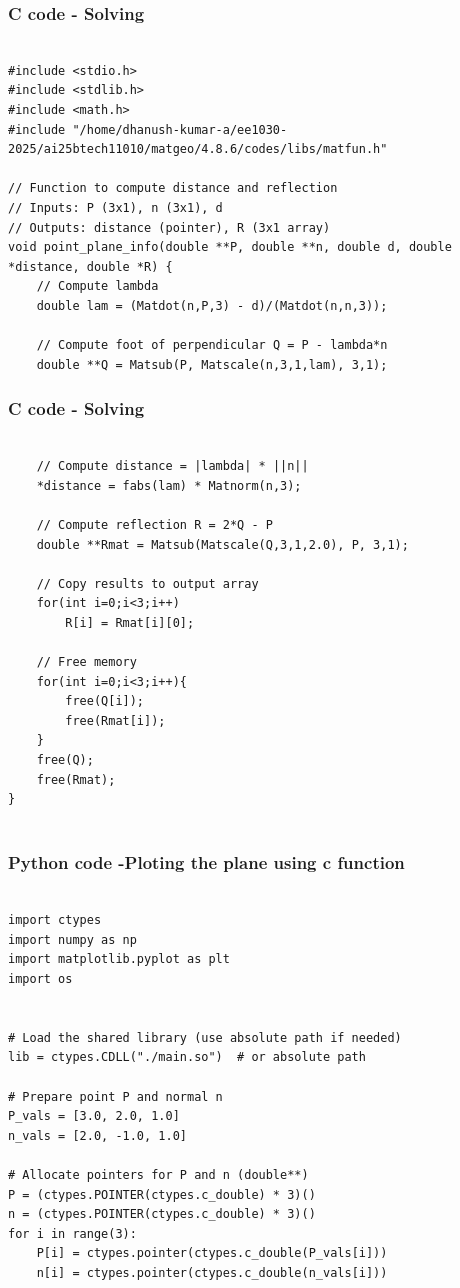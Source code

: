\documentclass{beamer}
\begin{document}
\begin{frame}[fragile]                            
\frametitle{C code - Solving}                
\begin{lstlisting}

#include <stdio.h>
#include <stdlib.h>
#include <math.h>
#include "/home/dhanush-kumar-a/ee1030-2025/ai25btech11010/matgeo/4.8.6/codes/libs/matfun.h"

// Function to compute distance and reflection
// Inputs: P (3x1), n (3x1), d
// Outputs: distance (pointer), R (3x1 array)
void point_plane_info(double **P, double **n, double d, double *distance, double *R) {
    // Compute lambda
    double lam = (Matdot(n,P,3) - d)/(Matdot(n,n,3));

    // Compute foot of perpendicular Q = P - lambda*n
    double **Q = Matsub(P, Matscale(n,3,1,lam), 3,1);
\end{lstlisting}
\end{frame}

\begin{frame}[fragile]                            
\frametitle{C code - Solving}                
\begin{lstlisting}

    // Compute distance = |lambda| * ||n||
    *distance = fabs(lam) * Matnorm(n,3);

    // Compute reflection R = 2*Q - P
    double **Rmat = Matsub(Matscale(Q,3,1,2.0), P, 3,1);

    // Copy results to output array
    for(int i=0;i<3;i++)
        R[i] = Rmat[i][0];

    // Free memory
    for(int i=0;i<3;i++){
        free(Q[i]);
        free(Rmat[i]);
    }
    free(Q);
    free(Rmat);
}


\end{lstlisting}
\end{frame}

	
\begin{frame}[fragile]                              
	\frametitle{Python code -Ploting the plane using c function} 
	\begin{lstlisting}

import ctypes
import numpy as np
import matplotlib.pyplot as plt
import os


# Load the shared library (use absolute path if needed)
lib = ctypes.CDLL("./main.so")  # or absolute path

# Prepare point P and normal n
P_vals = [3.0, 2.0, 1.0]
n_vals = [2.0, -1.0, 1.0]

# Allocate pointers for P and n (double**)
P = (ctypes.POINTER(ctypes.c_double) * 3)()
n = (ctypes.POINTER(ctypes.c_double) * 3)()
for i in range(3):
    P[i] = ctypes.pointer(ctypes.c_double(P_vals[i]))
    n[i] = ctypes.pointer(ctypes.c_double(n_vals[i]))
\end{lstlisting}
\end{frame}
\end{document}

